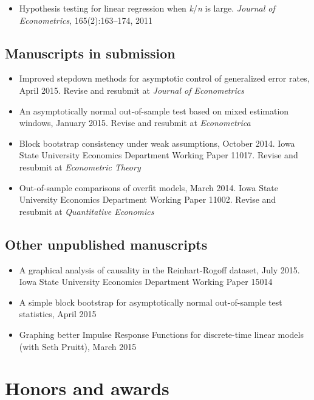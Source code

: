 \documentclass[12pt]{article}%
\begin{document}
\begin{itemize}
\item Hypothesis testing for linear regression when
\textit{k}/\textit{n} is large. \textit{Journal of Econometrics},
165(2):163--174, 2011
\end{itemize}

\subsection*{Manuscripts in submission}

\begin{itemize}
\item Improved stepdown methods for asymptotic control of generalized
error rates, April 2015. Revise and resubmit at \textit{Journal of
Econometrics}
\item An asymptotically normal out-of-sample test based on mixed
estimation windows, January 2015. Revise and resubmit at
\textit{Econometrica}
\item Block bootstrap consistency under weak assumptions, October
2014.  Iowa State University Economics Department Working Paper
11017. Revise and resubmit at \textit{Econometric Theory}
\item Out-of-sample comparisons of overfit models, March 2014. Iowa
State University Economics Department Working Paper 11002. Revise and
resubmit at \textit{Quantitative Economics}
\end{itemize}

\subsection*{Other unpublished manuscripts}
\begin{itemize}
\item A graphical analysis of causality in the Reinhart-Rogoff
dataset, July 2015. Iowa State University Economics Department Working
Paper 15014
\item A simple block bootstrap for asymptotically normal out-of-sample
test statistics, April 2015
\item Graphing better Impulse Response Functions for discrete-time
linear models (with Seth Pruitt), March 2015
\end{itemize}

\section*{Honors and awards}
\end{document}
